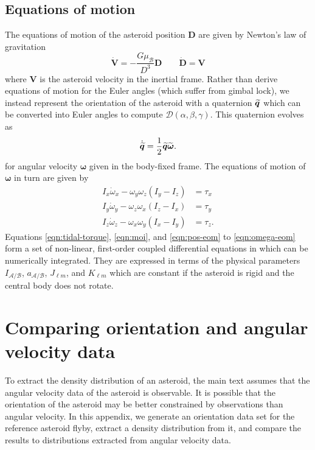 \subsection{Equations of motion}
\label{sec:eom}


The equations of motion of the asteroid position $\bm D$ are given by Newton's law of gravitation
\begin{equation}
  \dot{\bm V} = -\frac{G \mu_\mathcal{B}}{D^3} \bm D \qquad \dot{\bm D} = \bm V
  \label{eqn:pos-eom}
\end{equation}
where $\bm V$ is the asteroid velocity in the inertial frame. Rather than derive equations of motion for the Euler angles (which suffer from gimbal lock), we instead represent the orientation of the asteroid with a quaternion $\widetilde{\bm{q}}$ which can be converted into Euler angles to compute $\mathcal{D}(\alpha, \beta, \gamma)$. This quaternion evolves as 
\begin{equation}
  \dot{\widetilde{\bm{q}}} = \frac{1}{2}\widetilde{\bm{q}}\widetilde{\bm{\omega}}.
  \label{eqn:quat-eom}
\end{equation}
for angular velocity $\bm \omega$ given in the body-fixed frame. The equations of motion of $\bm \omega$ in turn are given by
\begin{equation}
  \begin{split}
    I_x \dot \omega_x - \omega_y \omega_z (I_y - I_z) &= \tau_x\\
    I_y \dot \omega_y - \omega_z \omega_x (I_z - I_x) &= \tau_y\\
    I_z \dot \omega_z - \omega_x \omega_y (I_x - I_y) &= \tau_z.
  \end{split}
  \label{eqn:omega-eom}
\end{equation}
Equations \ref{eqn:tidal-torque}, \ref{eqn:moi}, and \ref{eqn:pos-eom} to \ref{eqn:omega-eom} form a set of non-linear, first-order coupled differential equations in which can be numerically integrated. They are expressed in terms of the physical parameters $I_\mathcal{A/B}$, $a_\mathcal{A/B}$, $J_{\ell m}$, and $K_{\ell m}$ which are constant if the asteroid is rigid and the central body does not rotate.






\section{Comparing orientation and angular velocity data}

To extract the density distribution of an asteroid, the main text assumes that the angular velocity data of the asteroid is observable. It is possible that the orientation of the asteroid may be better constrained by observations than angular velocity. In this appendix, we generate an orientation data set for the reference asteroid flyby, extract a density distribution from it, and compare the results to distributions extracted from angular velocity data.

